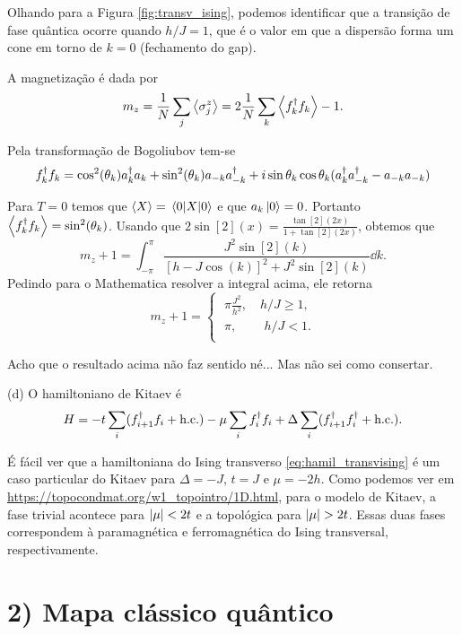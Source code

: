 \documentclass[a4paper,10pt]{article}
\begin{document}
Olhando para a Figura \ref{fig:transv_ising}, podemos identificar que a transição de fase quântica ocorre quando $h/J = 1$, que é o valor em que a dispersão forma um cone em torno de $k = 0$ (fechamento do gap).

\n

A magnetização é dada por
$$
m_z = \frac{1}{N} \sum_{j} \ev{\s_j^z} = 2 \frac{1}{N}\sum_{k} \ev{f_k^\d f_k} - 1.
$$

Pela transformação de Bogoliubov tem-se
$$
f_k^\dagger f_k = \cos[2](\theta_k) a_k^\dagger a_k + \sin[2](\theta_k) a_{-k}a_{-k}^\dagger
+ i \sin\theta_k \cos\theta_k (a_{k}^\dagger a_{-k}^\dagger - a_{-k} a_{-k})
$$

Para $T = 0$ temos que $\ev{X} = \ev{X}{0}$ e que $a_k \ket{0} = 0$. Portanto $\ev{f_k^\d f_k} = \sin[2](\theta_k)$. Usando que $2 \sin[2](x) = \frac{\tan[2](2x)}{1 + \tan[2](2x)}$, obtemos que
$$
m_z + 1 = \int_{-\pi}^{\pi} \frac{J^2 \sin[2](k)}{[h-J\cos(k)]^2 + J^2\sin[2](k)} \dd{k}.
$$
Pedindo para o Mathematica resolver a integral acima, ele retorna
$$
m_z + 1 =
\begin{cases}
\; \pi \frac{J^2}{h^2} , \quad h/J \geq 1, \\
\; \pi , \quad \quad \, h/J < 1. \\
\end{cases}
$$

Acho que o resultado acima não faz sentido né... Mas não sei como consertar.

\n

(d) O hamiltoniano de Kitaev é
$$
H = -t \sum_{i} (f_{i+1}^\dagger f_i + \text{h.c.}) - \mu \sum_{i} f_i^\dagger f_i
+ \Delta \sum_{i} (f_{i+1}^\dagger f_i^\dagger + \text{h.c.}).
$$

É fácil ver que a hamiltoniana do Ising transverso \ref{eq:hamil_transvising} é um caso particular do Kitaev para $\Delta = -J$, $t = J$ e $\mu = -2h$. Como podemos ver em \url{https://topocondmat.org/w1_topointro/1D.html}, para o modelo de Kitaev, a fase trivial acontece para $\abs{\mu} < 2t$ e a topológica para $\abs{\mu} > 2t$. Essas duas fases correspondem à paramagnética e ferromagnética do Ising transversal, respectivamente.

\n\n

\section*{2) Mapa clássico quântico}




%


\end{document}
